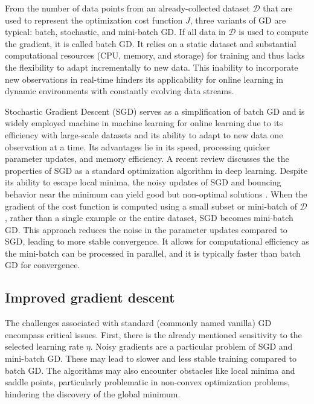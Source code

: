From the number of data points from an already-collected dataset $\mathcal{D}$ that are used to represent the optimization cost function $J$, three variants of GD are typical: batch, stochastic, and mini-batch GD. If all data in $\mathcal{D}$ is used to compute the gradient, it is called batch GD. It relies on a static dataset and substantial computational resources (CPU, memory, and storage) for training and thus lacks the flexibility to adapt incrementally to new data. This inability to incorporate new observations in real-time hinders its applicability for online learning in dynamic environments with constantly evolving data streams. 

Stochastic Gradient Descent (SGD) \cite{Bottou2012Stochasticgradientdescent} serves as a simplification of batch GD and is widely employed machine in machine learning for online learning due to its efficiency with large-scale datasets and its ability to adapt to new data one observation at a time. Its advantages lie in its speed, processing quicker parameter updates, and memory efficiency. A recent review \cite{Tian2023RecentAdvancesStochastic} discusses the the properties of SGD as a standard optimization algorithm in deep learning. Despite its ability to escape local minima, the noisy updates of SGD and bouncing behavior near the minimum can yield good but non-optimal solutions . When the gradient of the cost function is computed using a small subset or mini-batch of $\mathcal{D}$, rather than a single example or the entire dataset, SGD becomes mini-batch GD. This approach reduces the noise in the parameter updates compared to SGD, leading to more stable convergence. It allows for computational efficiency as the mini-batch can be processed in parallel, and it is typically faster than batch GD for convergence.

\subsection{Improved gradient descent}
The challenges associated with standard (commonly named vanilla) GD encompass critical issues. First, there is the already mentioned sensitivity to the selected learning rate $\eta$. Noisy gradients are a particular problem of SGD and mini-batch GD. These may lead to slower and less stable training compared to batch GD. The algorithms may also encounter obstacles like local minima and saddle points, particularly problematic in non-convex optimization problems, hindering the discovery of the global minimum.

